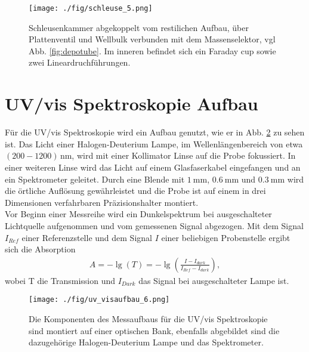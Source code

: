 \begin{figure}
    \centering
    \texttt{[image: ./fig/schleuse\_5.png]}
    \caption{Schleusenkammer abgekoppelt vom restilichen Aufbau, über Plattenventil und Wellbulk verbunden mit dem Massenselektor, vgl Abb. \ref{fig:depotube}. Im inneren befindet sich ein Faraday cup sowie zwei Lineardruchführungen.}
    \label{fig:schleuse}
\end{figure}


\section{UV/vis Spektroskopie Aufbau}
Für die UV/vis Spektroskopie wird ein Aufbau genutzt, wie er in Abb. \ref{fig:uv_visaufbau} zu sehen ist.
Das Licht einer Halogen-Deuterium Lampe, im Wellenlängenbereich von etwa $(200-1200)\,$nm, wird mit einer Kollimator Linse auf die Probe fokussiert.
In einer weiteren Linse wird das Licht auf einem Glasfaserkabel eingefangen und an ein Spektrometer geleitet.
Durch eine Blende mit $\SI{1}{\milli\meter}$, $\SI{0,6}{\milli\meter}$ und $\SI{0,3}{\milli\meter}$ wird die örtliche Auflösung gewährleistet und die Probe ist auf einem in drei Dimensionen verfahrbaren Präzisionshalter montiert.\\
Vor Beginn einer Messreihe wird ein Dunkelspektrum bei ausgeschalteter Lichtquelle aufgenommen und vom gemessenen Signal abgezogen. 
Mit dem Signal $I_{Ref}$ einer Referenzstelle und dem Signal $I$ einer beliebigen Probenstelle ergibt sich die Absorption 
\begin{align}
    A=- \lg\left(T\right) = -\lg\left(\frac{I-I_{dark}}{I_{Ref}-I_{dark}}\right),
\end{align}
wobei T die Transmission und $I_{Dark}$ das Signal bei ausgeschalteter Lampe ist.

\begin{figure}
    \centering
    \texttt{[image: ./fig/uv\_visaufbau\_6.png]}
    \caption{Die Komponenten des Messaufbaus für die UV/vis Spektroskopie sind montiert auf einer optischen Bank, ebenfalls abgebildet sind die dazugehörige Halogen-Deuterium Lampe und das Spektrometer.}
    \label{fig:uv_visaufbau}
\end{figure}
